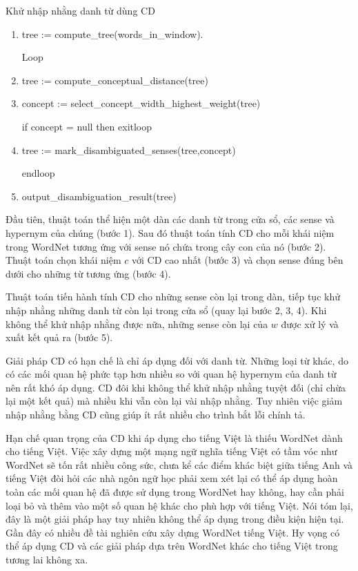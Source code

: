 \documentclass[a4paper,oneside,14pt]{extbook} %
\begin{document}
\begin{algo}\caption{Khử nhập nhằng danh từ dùng CD}
  \begin{enumerate}
  \item tree := compute\_tree(words\_in\_window).

    Loop
  \item tree := compute\_conceptual\_distance(tree)
  \item concept := select\_concept\_width\_highest\_weight(tree)
    
    if concept = null then exitloop
  \item tree := mark\_disambiguated\_senses(tree,concept)

    endloop
  \item output\_disambiguation\_result(tree)
  \end{enumerate}
\end{algo}

Đầu tiên, thuật toán thể hiện một dàn các danh từ trong cửa sổ, các
sense và hypernym của chúng (bước 1). Sau đó thuật toán tính
CD cho mỗi khái niệm trong WordNet tương ứng với sense
nó chứa trong cây con của nó (bước 2). Thuật toán chọn khái niệm $c$
với CD cao nhất (bước 3) và chọn sense đúng bên dưới
cho  những từ tương ứng (bước 4).

Thuật toán tiến hành tính CD cho những sense còn lại trong dàn, tiếp
tục khử nhập nhằng những danh từ còn lại trong cửa sổ (quay lại bước
2, 3, 4). Khi không thể khử nhập nhằng được nữa, những sense còn lại
của $w$ được xử lý và xuất kết quả ra (bước 5).

Giải pháp CD có hạn chế là chỉ áp dụng đối với danh từ. Những loại từ
khác, do có các mối quan hệ phức tạp hơn nhiều so với quan hệ hypernym
của danh từ nên rất khó áp dụng. CD đôi khi không thể khử nhập nhằng
tuyệt đối (chỉ chừa lại một kết quả) mà nhiều khi vẫn còn lại vài nhập
nhằng. Tuy nhiên việc giảm nhập nhằng bằng CD cũng giúp ít rất nhiều
cho trình bắt lỗi chính tả. 

Hạn chế quan trọng của CD khi áp dụng cho
tiếng Việt là thiếu WordNet dành cho tiếng Việt. Việc xây dựng một
mạng ngữ nghĩa tiếng Việt có tầm vóc như WordNet sẽ tốn rất nhiều công
sức, chưa kể các điểm khác biệt giữa tiếng Anh và tiếng Việt đòi hỏi
các nhà ngôn ngữ học phải xem xét lại có thể áp dụng hoàn toàn các mối quan hệ
đã được sử dụng trong WordNet hay không, hay cần phải loại bỏ và thêm
vào một số quan hệ khác cho phù hợp với tiếng Việt. Nói tóm lại, đây
là một giải pháp hay tuy nhiên không thể áp dụng trong điều kiện hiện
tại. Gần đây có nhiều đề tài nghiên cứu xây dựng WordNet tiếng
Việt. Hy vọng có thể áp dụng CD và các giải pháp dựa trên WordNet khác
cho tiếng Việt trong tương lai không xa.
\end{document}

